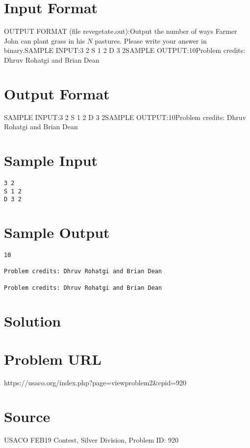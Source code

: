 \documentclass[12pt]{article}
\begin{document}
\section*{Input Format}
OUTPUT FORMAT (file revegetate.out):Output the number of ways Farmer John can plant grass in his $N$ pastures.
Please write your answer in binary.SAMPLE INPUT:3 2
S 1 2
D 3 2SAMPLE OUTPUT:10Problem credits: Dhruv Rohatgi and Brian Dean

\section*{Output Format}
SAMPLE INPUT:3 2
S 1 2
D 3 2SAMPLE OUTPUT:10Problem credits: Dhruv Rohatgi and Brian Dean

\section*{Sample Input}
\begin{verbatim}
3 2
S 1 2
D 3 2
\end{verbatim}

\section*{Sample Output}
\begin{verbatim}
10

Problem credits: Dhruv Rohatgi and Brian Dean

Problem credits: Dhruv Rohatgi and Brian Dean
\end{verbatim}

\section*{Solution}


\section*{Problem URL}
https://usaco.org/index.php?page=viewproblem2&cpid=920

\section*{Source}
USACO FEB19 Contest, Silver Division, Problem ID: 920
\end{document}
